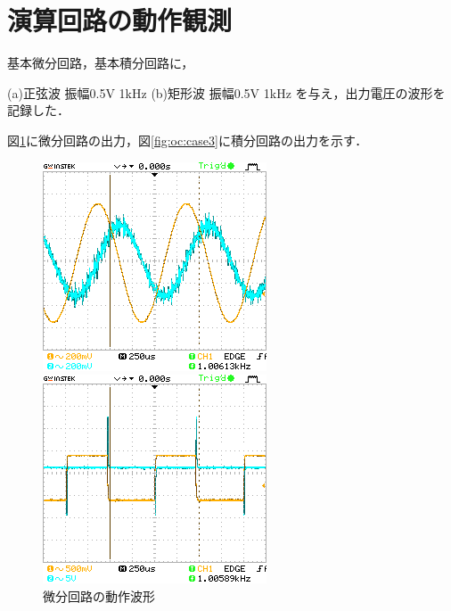 \documentclass[dvipdfmx,titlepage,a4j]{jsarticle}  %
\begin{document}
\section{演算回路の動作観測}
基本微分回路，基本積分回路に，

(a)正弦波 振幅0.5V 1kHz
(b)矩形波 振幅0.5V 1kHz
を与え，出力電圧の波形を記録した．

図\ref{fig:oc:case2}に微分回路の出力，図\ref{fig:oc:case3}に積分回路の出力を示す．

\begin{figure}[H]
  \centering
  \begin{minipage}{8cm}
    \centering
    \includegraphics[keepaspectratio, scale=0.8]{../image/DS0000.png}
  \end{minipage}
  \begin{minipage}{8cm}
    \centering
    \includegraphics[keepaspectratio, scale=0.8]{../image/DS0001.png}
  \end{minipage}
  \caption{微分回路の動作波形}
  \label{fig:oc:case2}
\end{figure}
\end{document}
